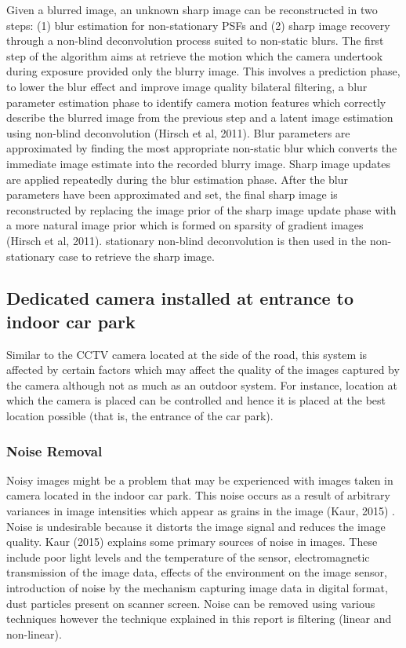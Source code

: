\documentclass[a4paper, 12pt]{article}
\begin{document}
\parskip 0.2in
Given a blurred image, an unknown sharp  image can be reconstructed in two steps: (1) blur estimation for non-stationary PSFs and (2) sharp image recovery through a non-blind deconvolution process suited to non-static blurs. The first step of the algorithm aims at retrieve the motion which the camera undertook during exposure provided only the blurry image. This involves a prediction phase, to lower the blur effect and improve image quality bilateral filtering, a blur parameter estimation phase to identify camera motion features which correctly describe the blurred image from the previous step and a latent image estimation using non-blind deconvolution (Hirsch et al, 2011). Blur parameters are approximated by finding the most appropriate non-static blur which converts the  immediate image estimate into the recorded blurry image. Sharp image updates are applied repeatedly during the blur estimation phase. After the blur parameters have been approximated and set, the final sharp image is reconstructed by replacing the image prior of the sharp image update phase with a more natural image prior which is formed on sparsity of gradient images (Hirsch et al, 2011). stationary non-blind deconvolution is then used in the non-stationary case to retrieve the sharp image. 

\newpage
\subsection{Dedicated camera installed at entrance to indoor car park}

Similar to the CCTV camera located at the side of the road, this system is affected by certain factors which may affect the quality of the images captured by the camera although not as much as an outdoor system. For instance, location at which the camera is placed can be controlled and hence it is placed at the best location possible (that is, the entrance of the car park).

\subsubsection{Noise Removal}

Noisy images might be a problem that may be experienced with images taken in camera located in the indoor car park. This noise occurs as a result of arbitrary variances in image intensities which appear as grains in the image (Kaur, 2015) . Noise is undesirable because it distorts the image signal and reduces the image quality. Kaur (2015) explains some primary sources of noise in images. These include poor light levels and the temperature of the sensor, electromagnetic transmission of the image data, effects of the environment on the image sensor, introduction of noise by the mechanism capturing image data in digital format, dust particles present on scanner screen. Noise can be removed using various techniques however the technique explained in this report is filtering (linear and non-linear). 
\parskip 0.2in
\end{document}
